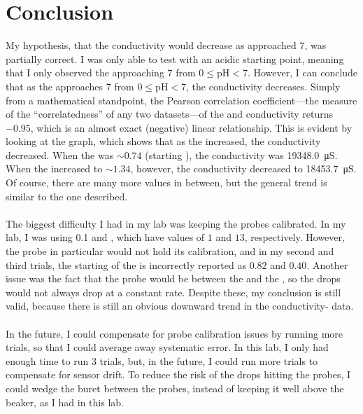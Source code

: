 \documentclass[a4paper]{article}
\newcommand{\pH}{\text{pH}}
\begin{document}
    \section{Conclusion}
        My hypothesis, that the conductivity would decrease as \pH{} approached $7$, was
        partially correct. I was only able to test with an acidic starting point, meaning
        that I only observed the \pH{} approaching $7$ from $0\le{\pH}<{7}$. However, I can
        conclude that as the \pH{} approaches $7$ from $0\le{\pH}<{7}$, the conductivity decreases.
        Simply from a mathematical standpoint, the Pearson correlation coefficient---the measure of the
        ``correlatedness'' of any two datasets---of the \pH and conductivity returns
        $-0.95$, which is an almost exact (negative) linear relationship. This is evident
        by looking at the graph, which shows that as the \pH{} increased, the conductivity
        decreased. When the \pH{} was $\sim0.74$ (starting \pH), the conductivity was
        \SI{19348.0}{\micro\siemens}. When the \pH{} increased to $\sim1.34$, however,
        the conductivity decreased to \SI{18453.7}{\micro\siemens}. Of course, there are
        many more values in between, but the general trend is similar to the one described.
        \\\\
        The biggest difficulty I had in my lab was keeping the probes calibrated.
        In my lab, I was using \SI{0.1}{\Molar}  and , which have \pH{}
        values of $1$ and $13$, respectively. However, the \pH{} probe in particular
        would not hold its calibration, and in my second and third trials, the starting \pH{}
        of the  is incorrectly reported as $0.82$ and $0.40$. Another issue was
        the fact that the probe would be between the  and the , so
        the drops would not always drop at a constant rate. Despite these, my conclusion
        is still valid, because there is still an obvious downward trend in the
        conductivity-\pH{} data.
        \\\\
        In the future, I could compensate for probe calibration issues by running more
        trials, so that I could average away systematic error. In this lab, I only had
        enough time to run 3 trials, but, in the future, I could run more trials
        to compensate for sensor drift. To reduce the risk of the drops hitting the probes,
        I could wedge the buret between the probes, instead of keeping it well above
        the beaker, as I had in this lab.
\end{document}
